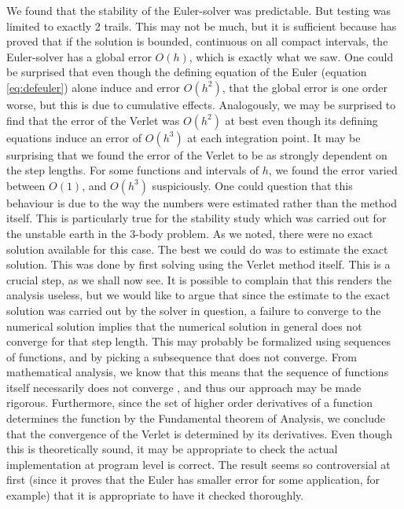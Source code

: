 \documentclass[11pt,english,a4paper]{article}
\begin{document}
We found that the stability of the Euler-solver was predictable. But testing was limited to exactly 2 trails. This may not be much, but it is sufficient because \cite[358]{morken_numerical_2013} has proved that if the solution is bounded, continuous on all compact intervals, the Euler-solver has a global error $O(h)$, which is exactly what we saw. One could be surprised that even though the defining equation of the Euler (equation \ref{eq:defeuler}) alone induce and error $O(h^2)$, that the global error is one order worse, but this is due to cumulative effects. Analogously, we may be surprised to find that the error of the Verlet was $O(h^2)$ at best even though its defining equations induce an error of $O(h^3)$ at each integration point. It may be surprising that we found the error of the Verlet to be as strongly dependent on the step lengths. For some functions and intervals of $h$, we found the error varied between $O(1)$, and $O(h^3)$ suspiciously. One could question that this behaviour is due to the way the numbers were estimated rather than the method itself. This is particularly true for the stability study which was carried out for the unstable earth in the 3-body problem. As we noted, there were no exact solution available for this case. The best we could do was to estimate the exact solution. This was done by first solving using the Verlet method itself. This is a crucial step, as we shall now see. It is possible to complain that this renders the analysis useless, but we would like to argue that since the estimate to the exact solution was carried out by the solver in question, a failure to converge to the numerical solution implies that the numerical solution in general does not converge for that step length. This may probably be formalized using sequences of functions, and by picking a subsequence that does not converge. From mathematical analysis, we know that this means that the sequence of functions itself necessarily does not converge \parencite[61]{lindstrom_mathematical_2016}, and thus our approach may be made rigorous. Furthermore, since the set of higher order derivatives of a function determines the function by the Fundamental theorem of Analysis, we conclude that the convergence of the Verlet is determined by its derivatives. Even though this is theoretically sound, it may be appropriate to check the actual implementation at program level is correct. The result seems so controversial at first (since it proves that the Euler has smaller error for some application, for example) that it is appropriate to have it checked thoroughly.\\
\end{document}
